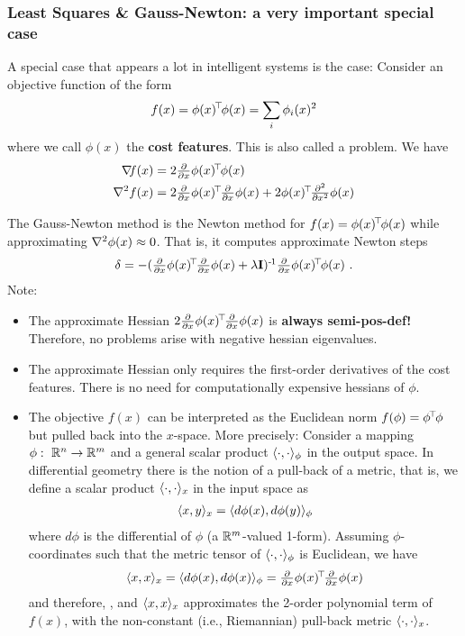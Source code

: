 \subsubsection{Least Squares \& Gauss-Newton: a very important special case}

A special case that appears a lot in intelligent systems is the
 case: Consider an objective function of the form
\begin{align}
f(x) = \phi(x)^{\!\top\!} \phi(x) = \sum_i \phi_i(x)^2
\end{align}
where we call $\phi(x)$ the \textbf{cost features}. This is also
called a  problem. We have
\begin{align}
\na f(x)
 &= 2 \Del{x}\phi(x)^\T \phi(x) \\
\he f(x)
 &= 2 \Del{x}\phi(x)^\T \Del{x}\phi(x) +
 2 \phi(x)^\T \Hes{x}\phi(x)
\end{align}

The Gauss-Newton method is the Newton method for         
$f(x) = \phi(x)^{\!\top\!} \phi(x)$ while approximating ${\nabla_{\!\!}^2} \phi(x)\approx
0$. That is, it computes approximate Newton steps 
\begin{equation}
{\delta} = - (\textstyle\frac{\partial}{\partial x}\phi(x)^{\!\top\!} \textstyle\frac{\partial}{\partial x}\phi(x) + \lambda {\rm\bf I})^{{\hspace*{-.0pt}\text{\rm -}\hspace*{-.5pt}}1} \textstyle\frac{\partial}{\partial x}\phi(x)^{\!\top\!} \phi(x) ~.
\end{equation}
Note:
\begin{itemize}
\item The approximate Hessian $2\textstyle\frac{\partial}{\partial x}\phi(x)^{\!\top\!} \textstyle\frac{\partial}{\partial x}\phi(x)$
is \textbf{always semi-pos-def!} Therefore, no problems arise with
negative hessian eigenvalues.
\item The approximate Hessian only requires the first-order
derivatives of the cost features. There is no need for
computationally expensive hessians of $\phi$.
\item The objective $f(x)$ can be interpreted as the Euclidean
norm $f(\phi) = \phi^{\!\top\!} \phi$ but pulled back into the $x$-space. More
precisely: Consider a mapping $\phi:~ {\mathbb{R}}^n \to {\mathbb{R}}^m$ and a general
scalar product $\langle\cdot,\cdot\rangle_\phi$ in the output space. In differential geometry
there is the notion of a pull-back of a metric, that is, we define a
scalar product $\langle\cdot,\cdot\rangle_x$ in the input space as
\begin{align}
\langle x,y\rangle_x = \langle d\phi(x),d\phi(y)\rangle_\phi
\end{align}
where $d\phi$ is the differential of $\phi$ (a ${\mathbb{R}}^m$-valued
1-form). Assuming $\phi$-coordinates such that the metric tensor of
$\langle\cdot,\cdot\rangle_\phi$ is Euclidean, we have
\begin{align}
\langle x,x\rangle_x = \langle d\phi(x),d\phi(x)\rangle_\phi = \textstyle\frac{\partial}{\partial x}\phi(x)^{\!\top\!} \textstyle\frac{\partial}{\partial x}\phi(x)
\end{align}
and therefore, , and $\langle x,x\rangle_x$
approximates the 2-order polynomial term of $f(x)$, with the
non-constant (i.e., Riemannian) pull-back metric $\langle\cdot,\cdot\rangle_x$.
\end{itemize}

